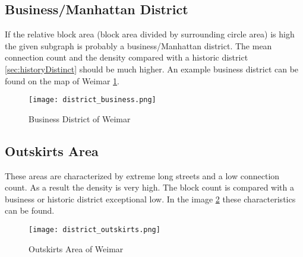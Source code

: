 \FloatBarrier
\subsection{Business/Manhattan District} 
\label{sec:businessDistinct}
If the relative block area (block area divided by surrounding circle area) is high the given subgraph is probably a business/Manhattan district. The mean connection count and the density compared with a historic district \ref{sec:historyDistinct} should be much higher. An example business district can be found on the map of Weimar \ref{fig:business_district}.

\begin{figure}[!ht]
    \centering
    \begin{mdframed}[style=mdthight, userdefinedwidth=0.4\textwidth, align=center]
        \texttt{[image: district\_business.png]}
    \end{mdframed}
    \caption{Business District of Weimar}
    \label{fig:business_district}
\end{figure}

\FloatBarrier
\subsection{Outskirts Area}
\label{sec:outskits}
These areas are characterized by extreme long streets and a low connection count. As a result the density is very high. The block count is compared with a business or historic district exceptional low. In the image \ref{fig:outskirts_district} these characteristics can be found.

\begin{figure}[!ht]
    \centering
    \begin{mdframed}[style=mdthight, userdefinedwidth=0.6\textwidth, align=center]
        \texttt{[image: district\_outskirts.png]}
    \end{mdframed}
    \caption{Outskirts Area of Weimar}
    \label{fig:outskirts_district}
\end{figure}